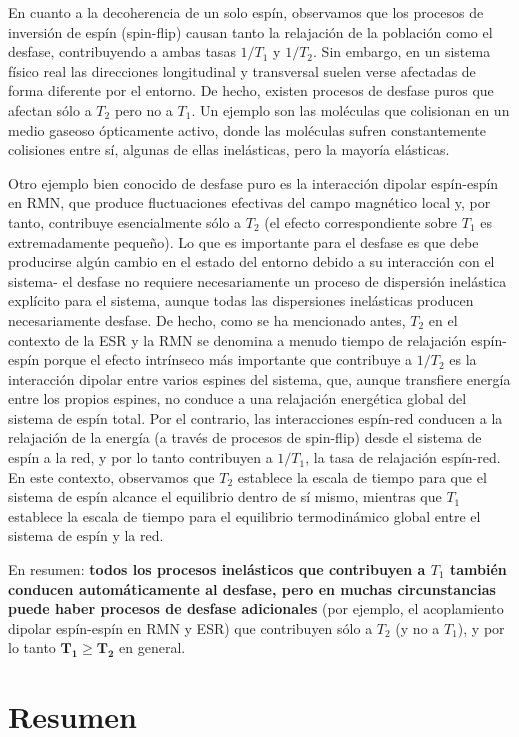 \documentclass[a4paper,11pt]{book} %
\numberwithin{equation}{chapter}
\begin{document}
En cuanto a la decoherencia de un solo espín, observamos que los procesos de inversión de espín (spin-flip) causan tanto la relajación de la población como el desfase, contribuyendo a ambas tasas $1/T_1$ y $1/T_2$. Sin embargo, en un sistema físico real las direcciones longitudinal y transversal suelen verse afectadas de forma diferente por el entorno. De hecho, existen procesos de desfase puros que afectan sólo a $T_2$ pero no a $T_1$. Un ejemplo son las moléculas que colisionan en un medio gaseoso ópticamente activo, donde las moléculas sufren constantemente colisiones entre sí, algunas de ellas inelásticas, pero la mayoría elásticas.

Otro ejemplo bien conocido de desfase puro es la interacción dipolar espín-espín en RMN, que produce fluctuaciones efectivas del campo magnético local y, por tanto, contribuye esencialmente sólo a $T_2$ (el efecto correspondiente sobre $T_1$ es extremadamente pequeño). Lo que es importante para el desfase es que debe producirse algún cambio en el estado del entorno debido a su interacción con el sistema- el desfase no requiere necesariamente un proceso de dispersión inelástica explícito para el sistema, aunque todas las dispersiones inelásticas producen necesariamente desfase. De hecho, como se ha mencionado antes, $T_2$ en el contexto de la ESR y la RMN se denomina a menudo tiempo de relajación espín-espín porque el efecto intrínseco más importante que contribuye a $1/T_2$ es la interacción dipolar entre varios espines del sistema, que, aunque transfiere energía entre los propios espines, no conduce a una relajación energética global del sistema de espín total. Por el contrario, las interacciones espín-red conducen a la relajación de la energía (a través de procesos de spin-flip) desde el sistema de espín a la red, y por lo tanto contribuyen a $1/T_1$, la tasa de relajación espín-red. En este contexto, observamos que $T_2$ establece la escala de tiempo para que el sistema de espín alcance el equilibrio dentro de sí mismo, mientras que $T_1$ establece la escala de tiempo para el equilibrio termodinámico global entre el sistema de espín y la red. 

En resumen: \textbf{todos los procesos inelásticos que contribuyen a $T_1$ también conducen automáticamente al desfase, pero en muchas circunstancias puede haber procesos de desfase adicionales} (por ejemplo, el acoplamiento dipolar espín-espín en RMN y ESR) que contribuyen sólo a $T_2$ (y no a $T_1$), y por lo tanto $\bm{T_1 \geq T_2}$ en general.


	\section{Resumen}
\end{document}

